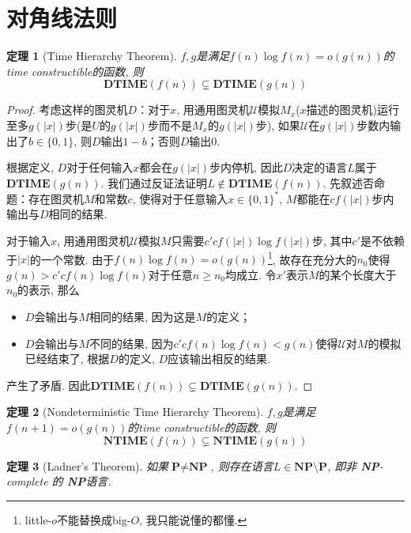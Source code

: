 \documentclass[8pt]{article}
\theoremstyle{compact}
\newtheorem{theorem}{定理}
\def\ge{\geqslant}
\def\DTIME{\textbf{DTIME}}
\def\NTIME{\textbf{NTIME}}
\def\P{\textbf{P}}
\def\NP{\textbf{NP}}
\begin{document}
\section{对角线法则}
\begin{theorem}[Time Hierarchy Theorem]
	$f, g$是满足$f(n) \log f(n) = o(g(n))$的time constructible的函数, 则
	$$\DTIME(f(n)) \subsetneq \DTIME(g(n))$$
	\label{time_hierarchy_thm}
\end{theorem}
\begin{proof}
	考虑这样的图灵机$D$：对于$x$, 用通用图灵机$\mathcal{U}$模拟$M_x$($x$描述的图灵机)运行至多$g(|x|)$步(是$U$的$g(|x|)$步而不是$M_x$的$g(|x|)$步), 如果$\mathcal{U}$在$g(|x|)$步数内输出了$b \in \{0, 1\}$, 则$D$输出$1-b$；否则$D$输出$0$. 

	根据定义, $D$对于任何输入$x$都会在$g(|x|)$步内停机, 因此$D$决定的语言$L$属于$\DTIME(g(n))$. 我们通过反证法证明$L \notin \DTIME(f(n))$. 先叙述否命题：存在图灵机$M$和常数$c$, 使得对于任意输入$x \in \{0, 1\}^*$, $M$都能在$cf(|x|)$步内输出与$D$相同的结果. 

	对于输入$x$, 用通用图灵机$\mathcal{U}$模拟$M$只需要$c'cf(|x|)\log f(|x|)$步, 其中$c'$是不依赖于$|x|$的一个常数. 由于$f(n) \log f(n) = o(g(n))$\footnote{little-$o$不能替换成big-$O$, 我只能说懂的都懂. }, 故存在充分大的$n_0$使得$g(n) > c'cf(n) \log f(n)$对于任意$n \ge n_0$均成立. 令$x'$表示$M$的某个长度大于$n_0$的表示, 那么
	\begin{itemize}
		\item $D$会输出与$M$相同的结果, 因为这是$M$的定义；
		\item $D$会输出与$M$不同的结果, 因为$c'cf(n)\log f(n) < g(n)$使得$\mathcal U$对$M$的模拟已经结束了, 根据$D$的定义, $D$应该输出相反的结果. 
	\end{itemize}

	产生了矛盾. 因此$\DTIME(f(n)) \subsetneq \DTIME(g(n))$. 
\end{proof}
\begin{theorem}[Nondeterministic Time Hierarchy Theorem]
	$f, g$是满足$f(n + 1) = o(g(n))$的time constructible的函数, 则
	$$\NTIME(f(n)) \subsetneq \NTIME(g(n))$$
\end{theorem}
\begin{theorem}[Ladner's Theorem]
	如果$\P \neq \NP$, 则存在语言$L \in \NP \setminus \P$, 即非 \NP-complete 的 \NP 语言. 
\end{theorem}

\newpage
\end{document}
